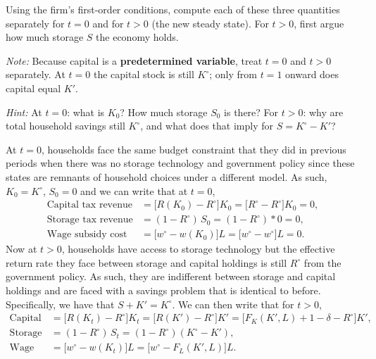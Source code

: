 \documentclass[11pt,english]{article}
\begin{document}
\begin{enumerate}
        Using the firm's first-order conditions, compute each of these three
        quantities separately for $t = 0$ and for $t > 0$ (the new steady
        state). For $t > 0$, first argue how much storage $S$ the economy holds.
 
        \textit{Note:} Because capital is a \textbf{predetermined variable},
        treat $t = 0$ and $t > 0$ separately. At $t = 0$ the capital stock is
        still $K^\circ$; only from $t = 1$ onward does capital equal $K'$.
 
        \textit{Hint:} At $t = 0$: what is $K_0$? How much storage $S_0$ is
        there? For $t > 0$: why are total household savings still $K^\circ$, and
        what does that imply for $S = K^\circ - K'$?
    \begin{solution}
 At $t = 0$, households face the same budget constraint that they did in previous periods when there was no storage technology and government policy since these states are remnants of household choices under a different model. As such, $K_0 = K^\circ$, $S_0 = 0$ and we can write that at $t = 0$,
\begin{align*}
            \text{Capital tax revenue}  &= \bigl[R(K_0) - R^\circ\bigr] K_0 = \bigl[R^\circ - R^\circ\bigr] K_0 = 0, \\
            \text{Storage tax revenue}  &= (1 - R^\circ)\, S_0 = (1 - R^\circ) * 0 = 0, \\
            \text{Wage subsidy cost}    &= \bigl[w^\circ - w(K_0)\bigr] L = \bigl[w^\circ - w^\circ\bigr] L = 0.
        \end{align*}Now at $t > 0$, households have access to storage technology but the effective return rate they face between storage and capital holdings is still $R^\circ$ from the government policy. As such, they are indifferent between storage and capital holdings and are faced with a savings problem that is identical to before. Specifically, we have that $S + K' = K^\circ$. We can then write that for $t > 0$,
\begin{align*}
            \text{Capital tax revenue}  &= \bigl[R(K_t) - R^\circ\bigr] K_t = \bigl[R(K') - R^\circ\bigr] K' = \bigl[F_K(K', L) + 1 - \delta - R^\circ\bigr] K', \\
            \text{Storage tax revenue}  &= (1 - R^\circ)\, S_t = (1 - R^\circ) (K^\circ - K'), \\
            \text{Wage subsidy cost}    &= \bigl[w^\circ - w(K_t)\bigr] L = \bigl[w^\circ - F_L(K',L)\bigr] L.
        \end{align*}
    \end{solution}
 

\end{enumerate}
\end{document}
